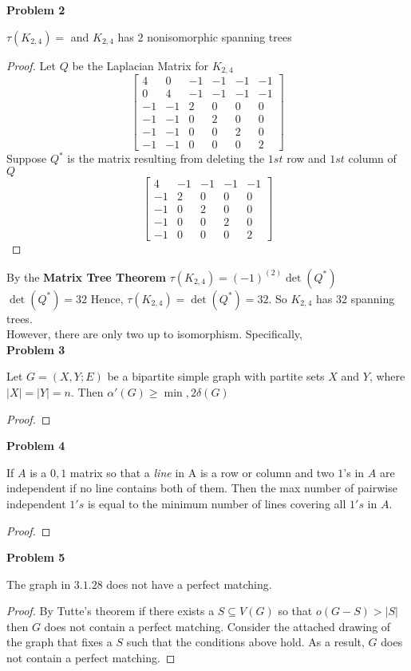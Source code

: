 \documentclass{article}
\newenvironment{claim}[2][Claim]{\begin{trivlist}
		\item[\hskip \labelsep {\bfseries #1}\hskip \labelsep {\bfseries #2}]}{\end{trivlist}}
\begin{document}
\noindent \textbf{Problem 2}
\begin{claim}{}
	$\tau(K_{2,4}) = $ and $K_{2,4}$ has $2$ nonisomorphic spanning trees
\end{claim}
\begin{proof}
Let $Q$ be the Laplacian Matrix for $K_{2,4}$ 
\[
\begin{bmatrix}
	4  &  0  & -1 & -1 & -1 & -1 \\
	0  &  4  & -1 & -1 & -1 & -1 \\
	-1 & -1  &  2 &  0 &  0 &  0 \\
	-1 & -1  &  0 &  2 &  0 &  0 \\
	-1 & -1  &  0 &  0 &  2 &  0 \\
	-1 & -1  &  0 &  0 &  0 &  2 
\end{bmatrix}
\]
Suppose $Q^*$ is the matrix resulting from deleting the $1st$ row and $1st$ column of $Q$
\[
\begin{bmatrix}
 4  & -1 & -1 & -1 & -1 \\
-1  &  2 &  0 &  0 &  0 \\
-1  &  0 &  2 &  0 &  0 \\
-1  &  0 &  0 &  2 &  0 \\
-1  &  0 &  0 &  0 &  2 
\end{bmatrix}
\]
\end{proof}
By the \textbf{Matrix Tree Theorem} $\tau(K_{2,4}) = (-1)^(2) \det(Q^*)$
$\det(Q^*) = 32$
Hence, $\tau(K_{2, 4}) = \det(Q^*) = 32$. So $K_{2,4}$ has $32$ spanning trees. \\
However, there are only two up to isomorphism. Specifically, 
\\\noindent \textbf{Problem 3}
\begin{claim}{}
Let $G = (X,Y ; E)$ be a bipartite simple graph with partite sets $X$ and $Y$, where $|X| = |Y| = n$. Then $\alpha'(G) \geq \min{, 2 \delta(G)}$ 
\end{claim}
\begin{proof}

\end{proof}

\noindent \textbf{Problem 4}
\begin{claim}{}
If $A$ is a $0, 1$ matrix so that a \textit{line} in A is a row or column and two $1$'s in $A$ are independent if no line contains both of them. Then the max number of pairwise independent $1's$ is equal to the minimum number of lines covering all $1's$ in $A$.
\end{claim}
\begin{proof}

\end{proof}

\noindent \textbf{Problem 5}
\begin{claim}{}
The graph in $3.1.28$ does not have a perfect matching.
\end{claim}
\begin{proof}
By Tutte's theorem if there exists a $S \subseteq V(G)$ so that $o(G - S) > |S|$ then $G$ does not contain a perfect matching. Consider the attached drawing of the graph that fixes a $S$ such that the conditions above hold. As a result, $G$ does not contain a perfect matching.
\end{proof}
\end{document}
